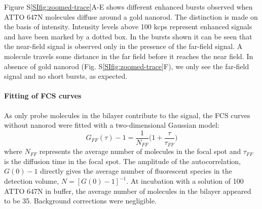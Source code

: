 Figure S\ref{SIfig:zoomed-trace}A-E shows different enhanced bursts observed when ATTO 647N molecules diffuse around a gold nanorod.
The distinction is made on the basis of intensity.
Intensity levels above 100 kcps represent enhanced signals and have been marked by a dotted box.
In the bursts shown it can be seen that the near-field signal is observed only in the presence of the far-field signal.
A molecule travels some distance in the far field before it reaches the near field.
In absence of gold nanorod (Fig. S\ref{SIfig:zoomed-trace}F), we only see the far-field signal and no short bursts, as expected.


\paragraph*{Fitting of FCS curves}
As only probe molecules in the bilayer contribute to the signal, the FCS curves without nanorod were fitted with a two-dimensional Gaussian model:
\begin{equation}
  G_{FF}(\tau)-1 = \frac{1}{N_{FF}}\Bigg(1+\frac{\tau}{\tau_{FF}}\Bigg)
  \label{eq:2Dgauss}
\end{equation}
where $N_{FF}$ represents the average number of molecules in the focal spot and $\tau_{FF}$ is the diffusion time in the focal spot.
The amplitude of the autocorrelation, $G(0)-1$ directly gives the average number of fluorescent species in the detection volume, $N=[G(0)-1]^{-1}$.
At incubation with a solution of \SI{100}{\nM} ATTO 647N in buffer, the average number of molecules in the bilayer appeared to be 35.
Background corrections were negligible.


